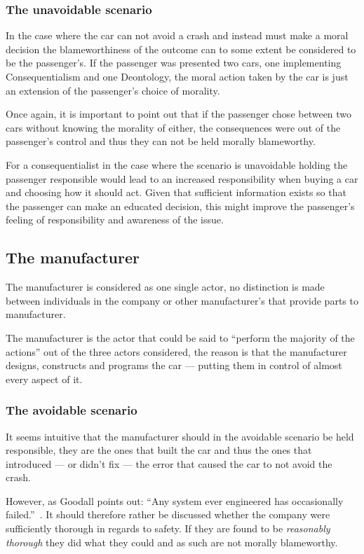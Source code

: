 \subsubsection{The unavoidable scenario}
In the case where the car can not avoid a crash and instead must make a moral
decision the blameworthiness of the outcome can to some extent be considered to
be the passenger's. If the passenger was presented two cars, one implementing
Consequentialism and one Deontology, the moral action taken by the car is just
an extension of the passenger's choice of morality.

Once again, it is important to point out that if the passenger chose between two
cars without knowing the morality of either, the consequences were out of the
passenger's control and thus they can not be held morally blameworthy.

For a consequentialist in the case where the scenario is unavoidable holding the
passenger responsible would lead to an increased responsibility when buying a
car and choosing how it should act. Given that sufficient information exists so
that the passenger can make an educated decision, this might improve the
passenger's feeling of responsibility and awareness of the issue.

\subsection{The manufacturer}\label{sec:manufacturer}
The manufacturer is considered as one single actor, no distinction is made between
individuals in the company or other manufacturer's that provide parts to
manufacturer.

The manufacturer is the actor that could be said to ``perform the majority of
the actions'' out of the three actors considered, the reason is that the
manufacturer designs, constructs and programs the car --- putting them in
control of almost every aspect of it.

\subsubsection{The avoidable scenario}
It seems intuitive that the manufacturer should in the avoidable scenario be
held responsible, they are the ones that built the car and thus the ones that
introduced --- or didn't fix --- the error that caused the car to not avoid the
crash.

However, as Goodall points out: ``Any system ever engineered has occasionally
failed.''~\cite{goodall_2014_machine_meaav}. It should therefore rather be
discussed whether the company were sufficiently thorough in regards to safety.
If they are found to be \textit{reasonably thorough} they did what they could
and as such are not morally blameworthy.

